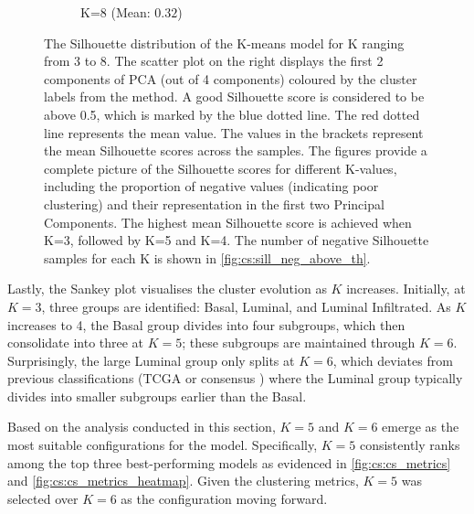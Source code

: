 \begin{figure}[H]
\begin{subfigure}[!t]{0.49\textwidth}
        \caption{K=8 (Mean: $0.32$)}
    \end{subfigure}
    \centering
    \caption{The Silhouette distribution of the K-means model for K ranging from 3 to 8. The scatter plot on the right displays the first 2 components of PCA (out of 4 components) coloured by the cluster labels from the method. A good Silhouette score is considered to be above 0.5, which is marked by the blue dotted line. The red dotted line represents the mean value. The values in the brackets represent the mean Silhouette scores across the samples. The figures provide a complete picture of the Silhouette scores for different K-values, including the proportion of negative values (indicating poor clustering) and their representation in the first two Principal Components. The highest mean Silhouette score is achieved when K=3, followed by K=5 and K=4. The number of negative Silhouette samples for each K is shown in \cref{fig:cs:sill_neg_above_th}.}
    \label{fig:cs:sill_distrib}
\end{figure}

Lastly, the Sankey plot visualises the cluster evolution as $K$ increases. Initially, at $K=3$, three groups are identified: Basal, Luminal, and Luminal Infiltrated. As $K$ increases to 4, the Basal group divides into four subgroups, which then consolidate into three at $K=5$; these subgroups are maintained through $K=6$. Surprisingly, the large Luminal group only splits at $K=6$, which deviates from previous classifications (TCGA\citet{Robertson2017-mg} or consensus \citet{Kamoun2020-tj}) where the Luminal group typically divides into smaller subgroups earlier than the Basal.

Based on the analysis conducted in this section, $K=5$ and $K=6$ emerge as the most suitable configurations for the model. Specifically, $K=5$ consistently ranks among the top three best-performing models as evidenced in \cref{fig:cs:cs_metrics} and \cref{fig:cs:cs_metrics_heatmap}. Given the clustering metrics, $K=5$ was selected over $K=6$ as the configuration moving forward.


